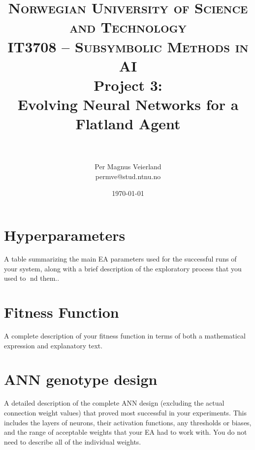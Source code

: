 

\title{
\normalfont \normalsize
\textsc{Norwegian University of Science and Technology\\IT3708 -- Subsymbolic Methods in AI}
\horrule{0.5pt} \\[0.4cm]
\huge Project 3:\\ Evolving Neural Networks for a Flatland Agent\\
\horrule{2pt} \\[0.5cm]
}

\author{Per Magnus Veierland\\permve@stud.ntnu.no}

\date{\normalsize\today}




\fancyfoot[C]{}
\maketitle

\section{Hyperparameters}

A table summarizing the main EA parameters used for the successful runs of your system,
along with a brief description of the exploratory process that you used to nd them..

\section{Fitness Function}

A complete description of your fitness function in terms of both a mathematical expression and explanatory text.

\section{\ac{ANN} genotype design}

A detailed description of the complete ANN design (excluding the actual connection weight values) that proved most successful in your experiments. This includes the layers of neurons, their activation functions, any thresholds or biases, and the range of acceptable weights that your EA had to work with. You do not need to describe all of the individual weights.

